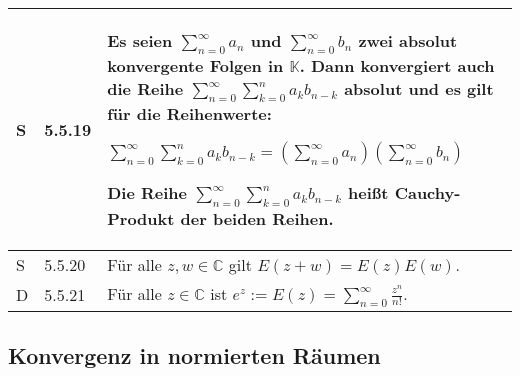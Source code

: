     \begin{longtable}{p{0.75cm} p{1cm} p{16cm}}
        \toprule
         S   & 5.5.19&   Es seien $\sum^{\infty}_{n=0} a_n$ und $\sum^{\infty}_{n=0} b_n$ zwei \textbf{absolut konvergente Folgen} in $\mathbb{K}$.
                Dann konvergiert auch die Reihe $\sum^{\infty}_{n=0} \sum^{n}_{k=0} a_k b_{n-k}$ \textbf{absolut} und es gilt für
                die Reihenwerte: \hfill \break
                \centerline{$\sum\limits^{\infty}_{n=0} \sum\limits^{n}_{k=0} a_k b_{n-k} = (\sum\limits^{\infty}_{n=0} a_n) (\sum\limits^{\infty}_{n=0} b_n)$} 
                Die Reihe $\sum\limits^{\infty}_{n=0} \sum\limits^{n}_{k=0} a_k b_{n-k}$ heißt \textbf{Cauchy-Produkt} der beiden Reihen. \\
        \midrule
        S   & 5.5.20&   Für alle $z,w \in \mathbb{C}$ gilt $E(z+w) = E(z)E(w)$. \\
        \midrule
        D   & 5.5.21&   Für alle $z \in \mathbb{C}$ ist $e^z:= E(z) = \sum\limits^{\infty}_{n=0} \frac{z^n}{n!}$. \\

        \bottomrule

    \end{longtable}

\pagebreak

\subsection{Konvergenz in normierten Räumen}

